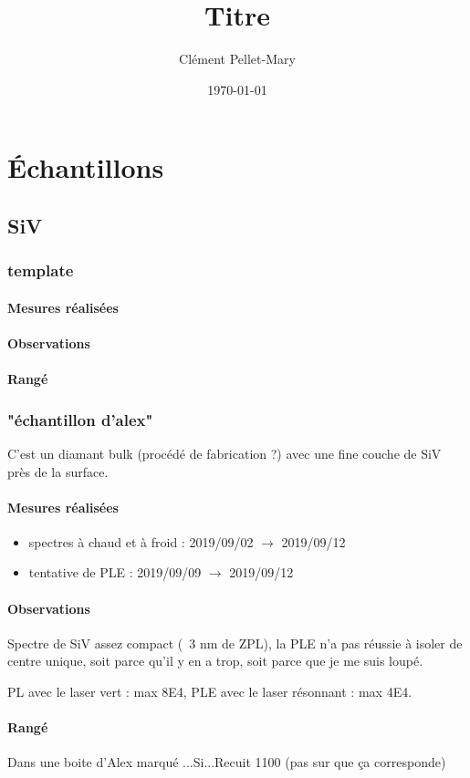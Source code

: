 \documentclass[a4paper]{report}
\title{Titre}
\author{Clément Pellet-Mary}
\date\today
\begin{document}
\chapter{Échantillons}

  \section{SiV}
  
  \subsection{template}
  \subsubsection{Mesures réalisées}
  \subsubsection{Observations}
  \subsubsection{Rangé}
  
  \subsection{"échantillon d'alex"} 
  C'est un diamant bulk (procédé de fabrication ?) avec une fine couche de SiV près de la surface.
  \subsubsection{Mesures réalisées}
  \begin{itemize}
  \item spectres à chaud et à froid : 2019/09/02 $\to$ 2019/09/12
  \item tentative de PLE : 2019/09/09 $\to$ 2019/09/12
  \end{itemize}
  \subsubsection{Observations}
  Spectre de SiV assez compact (~3 nm de ZPL), la PLE n'a pas réussie à isoler de centre unique, soit parce qu’il y en a trop, soit parce que je me suis loupé.
  
  PL avec le laser vert : max 8E4, PLE avec le laser résonnant : max 4E4.
  \subsubsection{Rangé}
  Dans une boite d'Alex marqué ...Si...Recuit 1100 (pas sur que ça corresponde)
 
\end{document}

